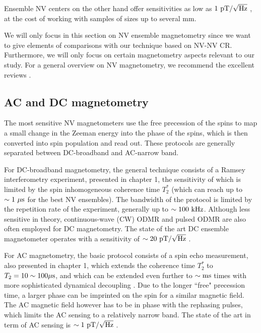 \documentclass[a4paper, 11pt]{report}
\begin{document}
Ensemble NV centers on the other hand offer sensitivities as low as $1\ \rm pT / \sqrt{\rm Hz}$ \citep{wolf2015subpicotesla}, at the cost of working with samples of sizes up to several mm.

We will only focus in this section on NV ensemble magnetometry since we want to give elements of comparisons with our technique based on NV-NV CR. Furthermore, we will only focus on certain magnetometry aspects relevant to our study. For a general overview on NV magnetometry, we recommend the excellent reviews \citep{rondin2014magnetometry, degen2017quantum, barry2020sensitivity}.

\subsection{AC and DC magnetometry}
The most sensitive NV magnetometers use the free precession of the spins to map a small change in the Zeeman energy into the phase of the spins, which is then converted into spin population and read out. These protocols are generally separated between DC-broadband and AC-narrow band.

For DC-broadband magnetometry, the general technique consists of a Ramsey interferometry experiment, presented in chapter 1, the sensitivity of which is limited by the spin inhomogeneous coherence time $T_2^*$ (which can reach up to $\sim 1\ \rm{\mu s}$ for the best NV ensembles). The bandwidth of the protocol is limited by the repetition rate of the experiment, generally up to $\sim 100\ \rm kHz$. Although less sensitive in theory, continuous-wave (CW) ODMR and pulsed ODMR are also often employed for DC magnetometry. The state of the art DC ensemble magnetometer operates with a sensitivity of $\sim 20\ \rm pT/ \sqrt{\rm Hz}$ \citep{barry2016optical, chatzidrosos2017miniature}.

For AC magnetometry, the basic protocol consists of a spin echo measurement, also presented in chapter 1, which extends the coherence time $T_2^*$ to $T_2 = 10 \sim 100 \rm{\mu s}$, and which can be extended even further to $\sim \rm ms$ times with more sophisticated dynamical decoupling \citep{pham2012enhanced}. Due to the longer ``free" precession time, a larger phase can be imprinted on the spin for a similar magnetic field. The AC magnetic field however has to be in phase with the rephasing pulses, which limits the AC sensing to a relatively narrow band. The state of the art in term of AC sensing is $\sim 1\ \rm pT/\sqrt{\rm Hz}$ \citep{wolf2015subpicotesla}.
\end{document}
